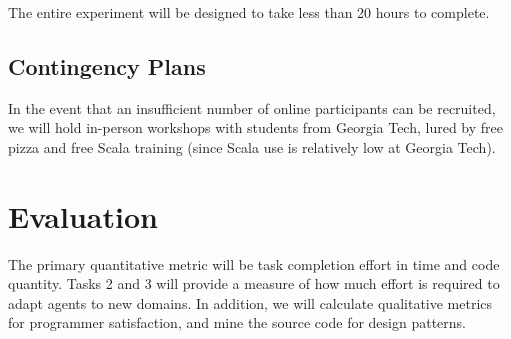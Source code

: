 The entire experiment will be designed to take less than 20 hours to complete.

\subsection{Contingency Plans}

In the event that an insufficient number of online participants can be recruited, we will hold in-person workshops with students from Georgia Tech, lured by free pizza and free Scala training (since Scala use is relatively low at Georgia Tech).

\section{Evaluation}

The primary quantitative metric will be task completion effort in time and code quantity.  Tasks 2 and 3 will provide a measure of how much effort is required to adapt agents to new domains.  In addition, we will calculate qualitative metrics for programmer satisfaction, and mine the source code for design patterns.

